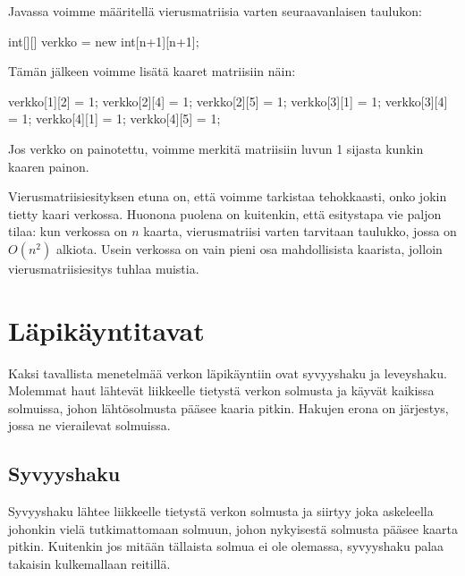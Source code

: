 Javassa voimme määritellä vierusmatriisia varten seuraavanlaisen taulukon:

\begin{code}
int[][] verkko = new int[n+1][n+1];
\end{code}

Tämän jälkeen voimme lisätä kaaret matriisiin näin:

\begin{code}
verkko[1][2] = 1;
verkko[2][4] = 1;
verkko[2][5] = 1;
verkko[3][1] = 1;
verkko[3][4] = 1;
verkko[4][1] = 1;
verkko[4][5] = 1;
\end{code}

Jos verkko on painotettu, voimme merkitä matriisiin luvun 1 sijasta
kunkin kaaren painon.

Vierusmatriisiesityksen etuna on, että voimme tarkistaa tehokkaasti,
onko jokin tietty kaari verkossa.
Huonona puolena on kuitenkin, että esitystapa vie paljon tilaa:
kun verkossa on $n$ kaarta, vierusmatriisi varten tarvitaan taulukko,
jossa on $O(n^2)$ alkiota.
Usein verkossa on vain pieni osa mahdollisista kaarista,
jolloin vierusmatriisiesitys tuhlaa muistia.

\section{Läpikäyntitavat}

Kaksi tavallista menetelmää verkon läpikäyntiin ovat syvyyshaku ja leveyshaku.
Molemmat haut lähtevät liikkeelle tietystä verkon solmusta ja käyvät
kaikissa solmuissa, johon lähtösolmusta pääsee kaaria pitkin.
Hakujen erona on järjestys, jossa ne vierailevat solmuissa.

\subsection{Syvyyshaku}

Syvyyshaku lähtee liikkeelle tietystä verkon solmusta ja siirtyy
joka askeleella johonkin vielä tutkimattomaan solmuun,
johon nykyisestä solmusta pääsee kaarta pitkin.
Kuitenkin jos mitään tällaista solmua ei ole olemassa,
syvyyshaku palaa takaisin kulkemallaan reitillä.

